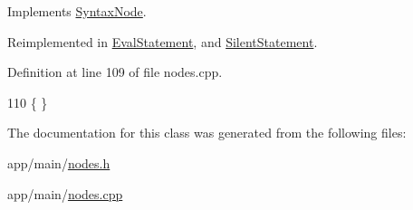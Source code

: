 Implements \hyperlink{classSyntaxNode_a2797ff5eb05f3a36ae1be41b70105e05}{Syntax\+Node}.



Reimplemented in \hyperlink{classEvalStatement_a9b77319533fab13e48c720b47a4d26b7}{Eval\+Statement}, and \hyperlink{classSilentStatement_a5778745fefed52ad409b26e778805b03}{Silent\+Statement}.



Definition at line 109 of file nodes.\+cpp.


\begin{DoxyCode}
110 \{ \}
\end{DoxyCode}


The documentation for this class was generated from the following files\+:\begin{DoxyCompactItemize}
\item 
app/main/\hyperlink{nodes_8h}{nodes.\+h}\item 
app/main/\hyperlink{nodes_8cpp}{nodes.\+cpp}\end{DoxyCompactItemize}
